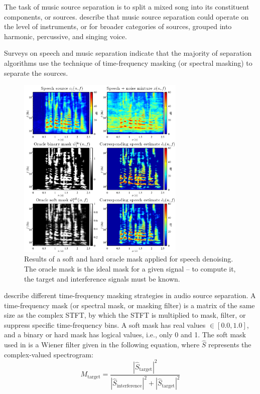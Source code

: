 \documentclass[letter,12pt,notitlepage]{article}
\begin{document}
The task of music source separation is to split a mixed song into its constituent components, or sources. \citet{musicsepgood} describe that music source separation could operate on the level of instruments, or for broader categories of sources, grouped into harmonic, percussive, and singing voice.

Surveys on speech \cite{speechmask} and music separation \cite{musicmask} indicate that the majority of separation algorithms use the technique of time-frequency masking (or spectral masking) to separate the sources.

\begin{figure}
	\vspace{-1.0em}
	\includegraphics[width=8cm]{./maskdemo.png}
	\caption{Results of a soft and hard oracle mask applied for speech denoising. The oracle mask is the ideal mask for a given signal -- to compute it, the target and interference signals must be known.}
	\label{fig:masks}
	\vspace{-1.5em}
\end{figure}

\citet{masking} describe different time-frequency masking strategies in audio source separation. A time-frequency mask (or spectral mask, or masking filter) is a matrix of the same size as the complex STFT, by which the STFT is multiplied to mask, filter, or suppress specific time-frequency bins. A soft mask has real values $\in [0.0, 1.0]$, and a binary or hard mask has logical values, i.e., only 0 and 1. The soft mask used in \cite{fitzgerald1, fitzgerald2} is a Wiener filter given in the following equation, where $\hat{S}$ represents the complex-valued spectrogram:
\[ M_{\text{target}} = \frac{|\hat{S}_{\text{target}}|^{2}}{|\hat{S}_{\text{interference}}|^{2} + |\hat{S}_{\text{target}}|^{2}} \]
\end{document}
